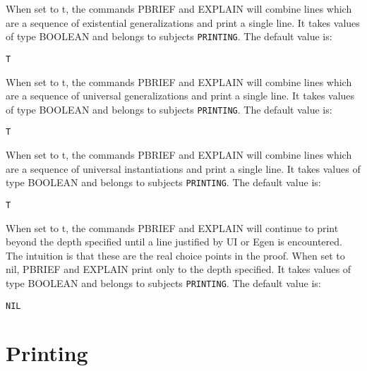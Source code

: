 \begin{description} 
\item[PRINT-COMBINED-EGENS]  
When set to t, the commands PBRIEF and EXPLAIN will combine
lines which are a sequence of existential generalizations and print a
single line.
It takes values of type BOOLEAN and belongs to subjects \texttt{PRINTING}.  The default value is: \begin{lstlisting}
T
\end{lstlisting}

\item[PRINT-COMBINED-UGENS]  
When set to t, the commands PBRIEF and EXPLAIN will combine
lines which are a sequence of universal generalizations and print a
single line.
It takes values of type BOOLEAN and belongs to subjects \texttt{PRINTING}.  The default value is: \begin{lstlisting}
T
\end{lstlisting}

\item[PRINT-COMBINED-UIS]  
When set to t, the commands PBRIEF and EXPLAIN will combine
lines which are a sequence of universal instantiations and print a
single line.
It takes values of type BOOLEAN and belongs to subjects \texttt{PRINTING}.  The default value is: \begin{lstlisting}
T
\end{lstlisting}

\item[PRINT-UNTIL-UI-OR-EGEN]  
When set to t, the commands PBRIEF and EXPLAIN will
continue to print beyond the depth specified until a line justified
by UI or Egen is encountered.  The intuition is that these are
the real choice points in the proof.  When set to nil, PBRIEF 
and EXPLAIN print only to the depth specified.
It takes values of type BOOLEAN and belongs to subjects \texttt{PRINTING}.  The default value is: \begin{lstlisting}
NIL
\end{lstlisting}

\item
\end{description}

\section{Printing}

